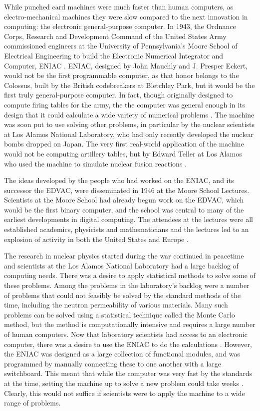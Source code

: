 \documentclass[\rootfolder/main.tex]{subfiles}
\begin{document}
While punched card machines were much faster than human computers, as electro-mechanical machines they were slow compared to the next innovation in computing: the electronic general-purpose computer.
In 1943, the Ordnance Corps, Research and Development Command of the United States Army commissioned engineers at the University of Pennsylvania's Moore School of Electrical Engineering
to build the Electronic Numerical Integrator and Computer, ENIAC \cite{sep-computing-history}\cite{reed1952}.
ENIAC, designed by John Mauchly and J. Presper Eckert, would not be the first programmable computer, as that honor belongs to the Colossus,
built by the British codebreakers at Bletchley Park\cite{winegrad1996}, but it would be the first truly general-purpose computer.
In fact, though originally designed to compute firing tables for the army, the the computer was general enough in its design that it could calculate a wide variety of numerical problems \cite{neyer}.
The machine was soon put to use solving other problems, in particular by the nuclear scientists at Los Alamos National Laboratory, who had only recently developed the nuclear bombs dropped on Japan.
The very first real-world application of the machine would not be computing artillery tables, but by Edward Teller at Los Alamos who used the machine to simulate nuclear fusion reactions \cite{AtomicHeritageFoundation}.

The ideas developed by the people who had worked on the ENIAC, and its successor the EDVAC, were disseminated in 1946 at the Moore School Lectures.
Scientists at the Moore School had already begun work on the EDVAC, which would be the first binary computer,
and the school was central to many of the earliest developments in digital computing.
The attendees at the lectures were all established academics, physicists and mathematicians and the lectures led to an explosion of activity in both the United States and Europe \cite{Davis2008}.

The research in nuclear physics started during the war continued in peacetime and scientists at the Los Alamos National Laboratory had a large backlog of computing needs.
There was a desire to apply statistical methods to solve some of these problems.
Among the problems in the laboratory's backlog were a number of problems that could not feasibly be solved by the standard methods of the time, including the neutron permeability of various materials.
Many such problems can be solved using a statistical technique called the Monte Carlo method, but the method is computationally intensive and requires a large number of human computers.
Now that laboratory scientists had access to an electronic computer, there was a desire to use the ENIAC to do the calculations \cite{Haigh2014}.
However, the ENIAC was designed as a large collection of functional modules, and was programmed by manually connecting these to one another with a large switchboard.
This meant that while the computer was very fast by the standards at the time, setting the machine up to solve a new problem could take weeks \cite{Rope2007}.
Clearly, this would not suffice if scientists were to apply the machine to a wide range of problems.
\end{document}
